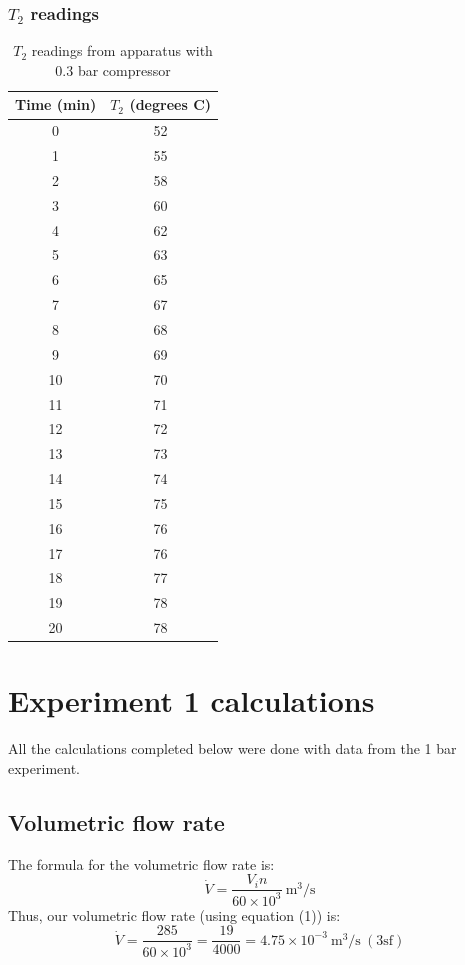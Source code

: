 \documentclass[class=article, crop=false, 12pt,a4paper]{standalone}
\begin{document}
\subsubsection{\(T_2\) readings}
\begin{table}
  \centering
    \begin{tabular}{|c|c|}
      \hline
      Time (\si{\minute}) & \(T_2\) (degrees C)\\
      \hline  
      0 & 52\\
      1 & 55\\
      2 & 58\\
      3 & 60\\
      4 & 62\\
      5 & 63\\
      6 & 65\\
      7 & 67\\
      8 & 68\\
      9 & 69\\
      10 & 70\\
      11 & 71\\
      12 & 72\\
      13 & 73\\
      14 & 74\\
      15 & 75\\
      16 & 76\\
      17 & 76\\
      18 & 77\\
      19 & 78\\
      20 & 78\\
      \hline
    \end{tabular}
  \caption{\(T_2\) readings from apparatus with 0.3 bar compressor}
  \label{table:3}
\end{table}
\section{Experiment 1 calculations}
All the calculations completed below were done with data from the 1 bar experiment.
\subsection{Volumetric flow rate}
The formula for the volumetric flow rate is:
\begin{equation}
  \dot{V} = \frac{V_in}{60 \times 10^3} \ \si{\meter\cubed\per\second}
  \label{volflowrate}
\end{equation}
Thus, our volumetric flow rate (using equation (1)) is:
\[ \dot{V} = \frac{285}{60\times 10^3} = \frac{19}{4000} = 4.75 \times 10^{-3} \ \si{\meter\cubed\per\second} \ (3\textrm{sf})\]
\end{document}
